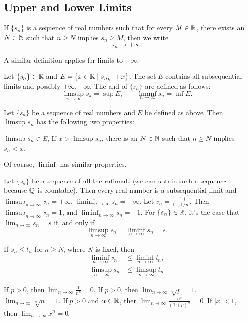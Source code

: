 \documentclass{article}
\begin{document}
\subsection{Upper and Lower Limits}
\begin{definition}
    If $\{s_{n}\}$ is a sequence of real numbers such that for every $M\in\mathbb R$, there exists an $N\in\mathbb N$ such that $n\geq N$ implies $s_{n}\geq M$, then we write \[s_{n}\rightarrow+\infty.\]
\end{definition}
A similar definition applies for limits to $-\infty$.
\begin{definition}
    Let $\{s_{n}\}\in \mathbb R$ and $E=\{x\in\mathbb R \mid s_{n_{k}}\rightarrow x\}$. The set $E$ contains all subsequential limits and possibly $+\infty,-\infty$. The  and  of $\{s_{n}\}$ are defined as follows:
    \[\limsup_{n\rightarrow\infty}s_{n}=\sup{E},\quad\quad\liminf_{n\rightarrow\infty}s_{n}=\inf{E}.\]
\end{definition}
\begin{theorem}
    Let $\{s_{n}\}$ be a sequence of real numbers and $E$ be defined as above. Then $\limsup{s_{n}}$ has the following two properties:
    \begin{enumerate}
        \ii $\limsup{s_{n}}\in E$,
        \ii If $x>\limsup{s_{n}}$, there is an $N\in\mathbb N$ such that $n\geq N$ implies $s_{n}<x$.
    \end{enumerate}
    Of course, $\liminf$ has similar properties.
\end{theorem}
\begin{example}
    \listhack
    \begin{enumerate}
        \ii Let $\{s_{n}\}$ be a sequence of all the rationals (we can obtain such a sequence because $\mathbb Q$ is countable). Then every real number is a subsequential limit and $\limsup_{n\rightarrow\infty}s_{n}=+\infty$, $\liminf_{n\rightarrow\infty}s_{n}=-\infty$.
        \ii Let $s_{n}=\frac{(-1)^{n}}{1+1/n}$. Then $\limsup_{n\rightarrow\infty}s_{n}=1$, and $\liminf_{n\rightarrow\infty}s_{n}=-1$.
        \ii For $\{s_{n}\}\in\mathbb R$, it's the case that $\lim_{n\rightarrow\infty} s_{n}=s$ if, and only if \[\limsup_{n\rightarrow\infty}s_{n}=\liminf_{n\rightarrow\infty}s_{n}=s.\]
    \end{enumerate}
\end{example}
\begin{theorem}
    If $s_{n}\leq t_{n}$ for $n\geq N$, where $N$ is fixed, then \begin{align*}
        \liminf_{n\rightarrow\infty}s_{n} & \leq \liminf_{n\rightarrow\infty}t_{n},\\
        \limsup_{n\rightarrow\infty}s_{n} & \leq \limsup_{n\rightarrow\infty}t_{n}
    \end{align*}
\end{theorem}
\begin{example}
    \listhack 
    \ii If $p>0$, then $\lim_{n\rightarrow\infty}\frac{1}{n^{p}}=0$.
    \ii If $p>0$, then $\lim_{n\rightarrow\infty}\sqrt[n]{p}=1$.
    \ii $\lim_{n\rightarrow\infty}\sqrt[n]{n}=1$.
    \ii If $p>0$ and $\alpha\in\mathbb R$, then $\lim_{n\rightarrow\infty}\frac{n^{\alpha}}{(1+p)^{n}}=0$.
    \ii If $|x|<1$, then $\lim_{n\rightarrow\infty}x^{n}=0$.
\end{example}
\end{document}
